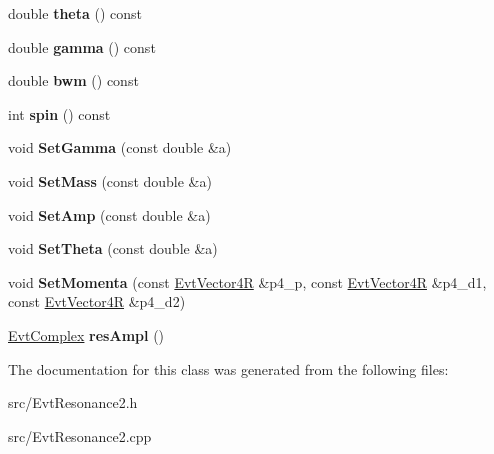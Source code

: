 \begin{DoxyCompactItemize}
\item 
\hypertarget{class_evt_resonance2_a27a7954c6768851defad5bf059f8e24a}{}double {\bfseries theta} () const \label{class_evt_resonance2_a27a7954c6768851defad5bf059f8e24a}

\item 
\hypertarget{class_evt_resonance2_ae3d498d426b3a8dad80ac7121d7afac1}{}double {\bfseries gamma} () const \label{class_evt_resonance2_ae3d498d426b3a8dad80ac7121d7afac1}

\item 
\hypertarget{class_evt_resonance2_a4817cbda62e8a95b8d54ded9f7eac4ec}{}double {\bfseries bwm} () const \label{class_evt_resonance2_a4817cbda62e8a95b8d54ded9f7eac4ec}

\item 
\hypertarget{class_evt_resonance2_af11dc4135c829f635fe19cf8ada15fa3}{}int {\bfseries spin} () const \label{class_evt_resonance2_af11dc4135c829f635fe19cf8ada15fa3}

\item 
\hypertarget{class_evt_resonance2_ac8d55936963271a5d5b6c2f068cf94ab}{}void {\bfseries Set\+Gamma} (const double \&a)\label{class_evt_resonance2_ac8d55936963271a5d5b6c2f068cf94ab}

\item 
\hypertarget{class_evt_resonance2_a5cec6b073ec4907eb8e07e662da4250d}{}void {\bfseries Set\+Mass} (const double \&a)\label{class_evt_resonance2_a5cec6b073ec4907eb8e07e662da4250d}

\item 
\hypertarget{class_evt_resonance2_a421604ec33eaf633d38f9f4608b9d5f0}{}void {\bfseries Set\+Amp} (const double \&a)\label{class_evt_resonance2_a421604ec33eaf633d38f9f4608b9d5f0}

\item 
\hypertarget{class_evt_resonance2_aae9841ed7226dfd6dc4619943bb0edbd}{}void {\bfseries Set\+Theta} (const double \&a)\label{class_evt_resonance2_aae9841ed7226dfd6dc4619943bb0edbd}

\item 
\hypertarget{class_evt_resonance2_a7993cda9de62cd03a1d1f5154df6959c}{}void {\bfseries Set\+Momenta} (const \hyperlink{class_evt_vector4_r}{Evt\+Vector4\+R} \&p4\+\_\+p, const \hyperlink{class_evt_vector4_r}{Evt\+Vector4\+R} \&p4\+\_\+d1, const \hyperlink{class_evt_vector4_r}{Evt\+Vector4\+R} \&p4\+\_\+d2)\label{class_evt_resonance2_a7993cda9de62cd03a1d1f5154df6959c}

\item 
\hypertarget{class_evt_resonance2_a888266127460601adcffe50deec86f27}{}\hyperlink{class_evt_complex}{Evt\+Complex} {\bfseries res\+Ampl} ()\label{class_evt_resonance2_a888266127460601adcffe50deec86f27}

\end{DoxyCompactItemize}


The documentation for this class was generated from the following files\+:\begin{DoxyCompactItemize}
\item 
src/Evt\+Resonance2.\+h\item 
src/Evt\+Resonance2.\+cpp\end{DoxyCompactItemize}
